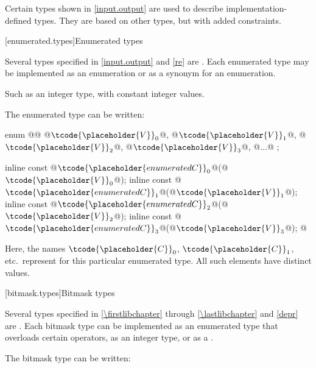 \pnum
Certain types shown in \ref{input.output} are used to describe implementation-defined types.
%
They are based on other types, but with added constraints.

[enumerated.types]{Enumerated types}

\pnum
Several types specified in \ref{input.output} and \ref{re} are
.
Each enumerated type may be implemented as an enumeration or as a synonym for
an enumeration.
\begin{footnote}
Such as an integer type, with constant integer
values.
\end{footnote}

\pnum
The enumerated type  can be written:

\begin{codeblock}
enum @@ { @$\tcode{\placeholder{V}}_{0}$@, @$\tcode{\placeholder{V}}_{1}$@, @$\tcode{\placeholder{V}}_{2}$@, @$\tcode{\placeholder{V}}_{3}$@, @$\ldots$@ };

inline const @$\tcode{\placeholder{enumerated C}}_{0}$@(@$\tcode{\placeholder{V}}_{0}$@);
inline const @$\tcode{\placeholder{enumerated C}}_{1}$@(@$\tcode{\placeholder{V}}_{1}$@);
inline const @$\tcode{\placeholder{enumerated C}}_{2}$@(@$\tcode{\placeholder{V}}_{2}$@);
inline const @$\tcode{\placeholder{enumerated C}}_{3}$@(@$\tcode{\placeholder{V}}_{3}$@);
  @\vdots@
\end{codeblock}

\pnum
Here, the names $\tcode{\placeholder{C}}_0$,
$\tcode{\placeholder{C}}_1$, etc.\ represent
for this particular enumerated type.
%
All such elements have distinct values.

[bitmask.types]{Bitmask types}

\pnum
Several types specified in \ref{\firstlibchapter} through \ref{\lastlibchapter}
and \ref{depr} are
.
Each bitmask type can be implemented as an
enumerated type that overloads certain operators, as an integer type,
or as a
.
%

\pnum
The bitmask type  can be written:

